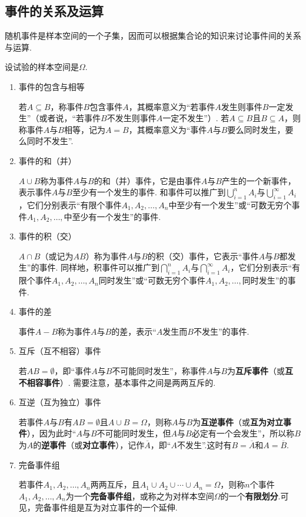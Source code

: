 \subsection{事件的关系及运算}
随机事件是样本空间的一个子集，因而可以根据集合论的知识来讨论事件间的关系与运算.

\begin{definition}
设试验的样本空间是\(\Omega\).

\begin{enumerate}
\item 事件的包含与相等

若\(A \subseteq B\)，称事件\(B\)包含事件\(A\)，其概率意义为“若事件\(A\)发生则事件\(B\)一定发生”（或者说，“若事件\(B\)不发生则事件\(A\)一定不发生”）.
若\(A \subseteq B\)且\(B \subseteq A\)，则称事件\(A\)与\(B\)相等，记为\(A = B\)，其概率意义为“事件\(A\)与\(B\)要么同时发生，要么同时不发生”.

\item 事件的和（并）

\(A \cup B\)称为事件\(A\)与\(B\)的和（并）事件，它是由事件\(A\)与\(B\)产生的一个新事件，表示事件\(A\)与\(B\)至少有一个发生的事件.
和事件可以推广到\(\bigcup\limits_{i=1}^n A_i\)与\(\bigcup\limits_{i=1}^{\infty} A_i\)，它们分别表示“有限个事件\(A_1,A_2,\dotsc,A_n\)中至少有一个发生”或“可数无穷个事件\(A_1,A_2,\dotsc,\)中至少有一个发生”的事件.

\item 事件的积（交）

\(A \cap B\)（或记为\(AB\)）称为事件\(A\)与\(B\)的积（交）事件，它表示“事件\(A\)与\(B\)都发生”的事件.
同样地，积事件可以推广到\(\bigcap\limits_{i=1}^n A_i\)与\(\bigcap\limits_{i=1}^{\infty} A_i\)，它们分别表示“有限个事件\(A_1,A_2,\dotsc,A_n\)同时发生”或“可数无穷个事件\(A_1,A_2,\dotsc,\)同时发生”的事件.

\item 事件的差

事件\(A-B\)称为事件\(A\)与\(B\)的差，表示“\(A\)发生而\(B\)不发生”的事件.

\item 互斥（互不相容）事件

若\(AB = \emptyset\)，即“事件\(A\)与\(B\)不可能同时发生”，称事件\(A\)与\(B\)为\textbf{互斥事件}（或\textbf{互不相容事件}）.
需要注意，基本事件之间是两两互斥的.

\item 互逆（互为独立）事件

若事件\(A\)与\(B\)有\(AB = \emptyset\)且\(A \cup B = \Omega\)，则称\(A\)与\(B\)为\textbf{互逆事件}（或\textbf{互为对立事件}），因为此时“\(A\)与\(B\)不可能同时发生，但\(A\)与\(B\)必定有一个会发生”，所以称\(B\)为\(A\)的\textbf{逆事件}（或\textbf{对立事件}），记作\(\overline{A}\)，即“\(A\)不发生”.这时有\(B = \overline{A}\)和\(A = \overline{B}\).

\item 完备事件组

若事件\(A_1,A_2,\dotsc,A_n\)两两互斥，且\(A_1 \cup A_2 \cup \dotsb \cup A_n = \Omega\)，则称\(n\)个事件\(A_1,A_2,\dotsc,A_n\)为一个\textbf{完备事件组}，或称之为对样本空间\(\Omega\)的一个\textbf{有限划分}.可见，完备事件组是互为对立事件的一个延伸.
\end{enumerate}
\end{definition}

